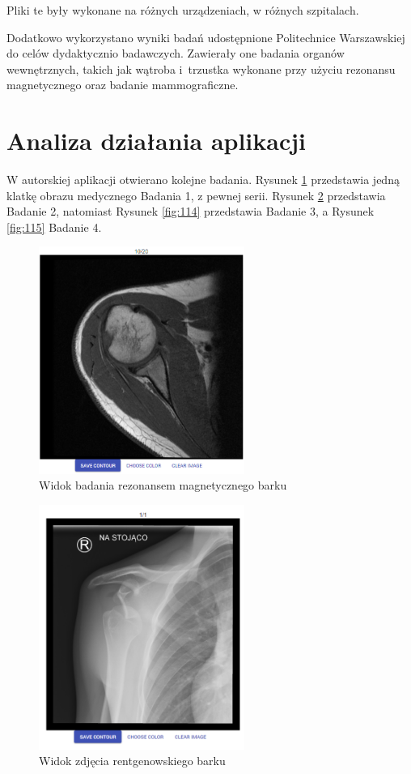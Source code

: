 \documentclass[a4paper,11pt,twoside,openright]{report}
\theoremstyle{definition}
\begin{document}
Pliki te były wykonane na różnych urządzeniach, w różnych szpitalach.

Dodatkowo wykorzystano wyniki badań udostępnione Politechnice Warszawskiej do
celów dydaktycznio badawczych. Zawierały one badania organów wewnętrznych, takich
jak wątroba i~trzustka wykonane przy użyciu rezonansu magnetycznego oraz badanie mammograficzne.

\section {Analiza działania aplikacji}

W autorskiej aplikacji otwierano kolejne badania. Rysunek \ref{fig:112} przedstawia
jedną klatkę obrazu medycznego Badania 1, z pewnej serii. Rysunek \ref{fig:113}
przedstawia Badanie 2, natomiast Rysunek \ref{fig:114} przedstawia Badanie 3, a
Rysunek \ref{fig:115} Badanie 4.

\begin{figure}[p]
	\center
	\includegraphics[width=0.6\textwidth]{112}
	\caption{Widok badania rezonansem magnetycznego barku}
    	\label{fig:112}
\end{figure}

\begin{figure}[p]
	\center
	\includegraphics[width=0.6\textwidth]{113}
	\caption{Widok zdjęcia rentgenowskiego barku}
    	\label{fig:113}
\end{figure}
\end{document}
